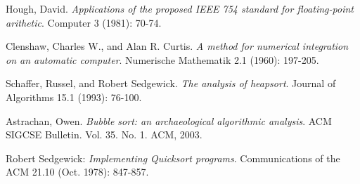 \begin{thebibliography}{x}
Hough, David. \emph{Applications of the proposed IEEE 754 standard for floating-point arithetic}. Computer 3 (1981): 70-74.

Clenshaw, Charles W., and Alan R. Curtis. \emph{A method for numerical integration on an automatic computer}. Numerische Mathematik 2.1 (1960): 197-205.

Schaffer, Russel, and Robert Sedgewick. \emph{The analysis of heapsort}. Journal of Algorithms 15.1 (1993): 76-100.

Astrachan, Owen. \emph{Bubble sort: an archaeological algorithmic analysis}. ACM SIGCSE Bulletin. Vol. 35. No. 1. ACM, 2003.

Robert Sedgewick: \emph{Implementing Quicksort programs}. Communications of the ACM 21.10 (Oct. 1978): 847-857.

\end{thebibliography}
